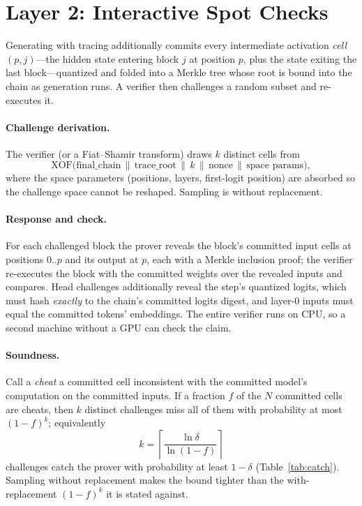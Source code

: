 \documentclass[11pt]{article}
\begin{document}
\section{Layer 2: Interactive Spot Checks}\label{sec:l2}

Generating with tracing additionally commits every intermediate activation
\emph{cell} $(p, j)$---the hidden state entering block $j$ at position $p$, plus
the state exiting the last block---quantized and folded into a Merkle tree whose
root is bound into the chain as generation runs. A verifier then challenges a
random subset and re-executes it.

\paragraph{Challenge derivation.} The verifier (or a Fiat--Shamir transform)
draws $k$ distinct cells from
\[
\text{XOF}\big(\text{final\_chain}\,\|\,\text{trace\_root}\,\|\,k\,\|\,\text{nonce}\,\|\,\text{space params}\big),
\]
where the space parameters (positions, layers, first-logit position) are
absorbed so the challenge space cannot be reshaped. Sampling is without
replacement.

\paragraph{Response and check.} For each challenged block the prover reveals the
block's committed input cells at positions $0..p$ and its output at $p$, each
with a Merkle inclusion proof; the verifier re-executes the block with the
committed weights over the revealed inputs and compares. Head challenges
additionally reveal the step's quantized logits, which must hash \emph{exactly}
to the chain's committed logits digest, and layer-$0$ inputs must equal the
committed tokens' embeddings. The entire verifier runs on CPU, so a second
machine without a GPU can check the claim.

\paragraph{Soundness.} Call a \emph{cheat} a committed cell inconsistent with the
committed model's computation on the committed inputs. If a fraction $f$ of the
$N$ committed cells are cheats, then $k$ distinct challenges miss all of them
with probability at most $(1-f)^k$; equivalently
\[
k = \left\lceil \frac{\ln \delta}{\ln(1-f)} \right\rceil
\]
challenges catch the prover with probability at least $1-\delta$
(Table~\ref{tab:catch}). Sampling without replacement makes the bound tighter
than the with-replacement $(1-f)^k$ it is stated against.
\end{document}
